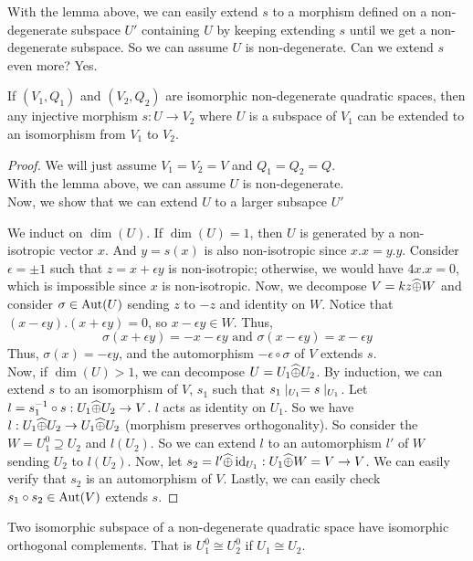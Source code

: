 \documentclass[15pt]{scrartcl}
\newcommand{\po}{\wh{\oplus}}
\begin{document}
With the lemma above, we can easily extend $s$ to a morphism defined on a non-degenerate subspace $U'$ containing $U$ by keeping extending $s$ until we get a non-degenerate subspace. So we can assume $U$ is non-degenerate. Can we extend $s$ even more? Yes. 
\begin{theorem}
    If $(V_1,Q_1)$ and $(V_2,Q_2)$ are isomorphic non-degenerate quadratic spaces, then any injective morphism $s: U\to V_2$ where $U$ is a subspace of $V_1$ can be extended to an isomorphism from $V_1$ to $V_2$.
\end{theorem}
\begin{proof}
    We will just assume $V_1=V_2=V$ and $Q_1=Q_2=Q$.
    \\

    With the lemma above, we can assume $U$ is non-degenerate. 
    \\

    Now, we show that we can extend $U$ to a larger subsapce $U'$ 
    
    We induct on $\dim(U)$. If $\dim(U)=1$, then $U$ is generated by a non-isotropic vector $x$. And $y=s(x)$ is also non-isotropic since $x.x=y.y$. Consider $\epsilon=\pm1$ such that $z=x+\epsilon y$ is non-isotropic; otherwise, we would have $4x.x=0$, which is impossible since $x$ is non-isotropic. Now, we decompose $V=kz\po W$ and consider $\sigma\in \operatorname{Aut}(U)$ sending $z$ to $-z$ and identity on $W$. Notice that $(x-\epsilon y).(x+\epsilon y)=0$, so $x-\epsilon y\in W$. Thus, 
    \[\sigma(x+\epsilon y)=-x-\epsilon y\text{ and } \sigma(x-\epsilon y)=x-\epsilon y\]
    Thus, $\sigma(x)=-\epsilon y$, and the automorphism $-\epsilon\circ \sigma$ of $V$ extends $s$. 
    \\

    Now, if $\dim(U)>1$, we can decompose $U=U_1\po U_2$. By induction, we can extend $s$ to an isomorphism of $V$, $s_1$ such that $s_1\mid_{U_1}=s\mid_{U_1}$. Let $l=s_1\inv \circ s: U_1\po U_2 \to V$. $l$ acts as identity on $U_1$. So we have $l: U_1\po U_2 \to U_1\po U_2$ (morphism preserves orthogonality). So consider the $W=U_1^0\supseteq U_2$ and $l(U_2)$. So we can extend $l$ to an automorphism $l'$ of $W$ sending $U_2$ to $l(U_2)$. Now, let $s_2=l'\po \id_{U_1}: U_1\po W=V \to V$. We can easily verify that $s_2$ is an automorphism of $V$. Lastly, we can easily check $s_1\circ s_2\in \operatorname{Aut}(V)$ extends $s$.

\end{proof}
\begin{corollary}
    Two isomorphic subspace of a non-degenerate quadratic space have isomorphic orthogonal complements. That is $U_1^0\cong U_2^0$ if $U_1\cong U_2$.
\end{corollary}
\end{document}
